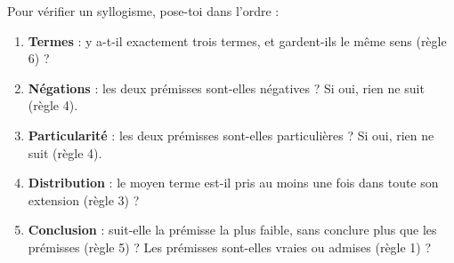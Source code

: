 \documentclass[11pt]{article}
\begin{document}
\begin{methode}
Pour vérifier un syllogisme, pose-toi dans l'ordre :
\begin{enumerate}
\item \textbf{Termes} : y a-t-il exactement trois termes, et gardent-ils le même sens (règle 6) ?
\item \textbf{Négations} : les deux prémisses sont-elles négatives ? Si oui, rien ne suit (règle 4).
\item \textbf{Particularité} : les deux prémisses sont-elles particulières ? Si oui, rien ne suit (règle 4).
\item \textbf{Distribution} : le moyen terme est-il pris au moins une fois dans toute son extension (règle 3) ?
\item \textbf{Conclusion} : suit-elle la prémisse la plus faible, sans conclure plus que les prémisses (règle 5) ? Les prémisses sont-elles vraies ou admises (règle 1) ?
\end{enumerate}
\end{methode}
\end{document}
